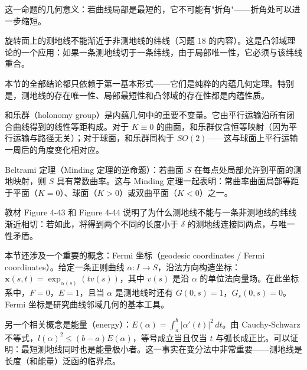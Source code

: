 这一命题的几何意义：若曲线局部是最短的，它不可能有"折角"——折角处可以进一步缩短。

\begin{Remark}
旋转面上的测地线不能渐近于非测地线的纬线（习题 18 的内容）。这是凸邻域理论的一个应用：如果一条测地线切于一条纬线，由于局部唯一性，它必须与该纬线重合。
\end{Remark}

\begin{Remark}
本节的全部结论都只依赖于第一基本形式——它们是纯粹的内蕴几何定理。特别是，测地线的存在唯一性、局部最短性和凸邻域的存在性都是内蕴性质。
\end{Remark}

\begin{Remark}
和乐群（holonomy group）是内蕴几何中的重要不变量。它由平行运输沿所有闭合曲线得到的线性等距构成。对于 $K\equiv 0$ 的曲面，和乐群仅含恒等映射（因为平行运输与路径无关）；对于球面，和乐群同构于 $SO(2)$——这与球面上平行运输一周后的角度变化相对应。
\end{Remark}

\begin{Remark}
 Beltrami 定理（Minding 定理的逆命题）：若曲面 $S$ 在每点处局部允许到平面的测地映射，则 $S$ 具有常数曲率。这与 Minding 定理一起表明：常曲率曲面局部等距于平面（$K=0$）、球面（$K>0$）或双曲平面（$K<0$）之一。
\end{Remark}

\begin{Remark}
教材 Figure 4-43 和 Figure 4-44 说明了为什么测地线不能与一条非测地线的纬线渐近相切：若如此，将得到两个不同的长度小于 $\delta$ 的测地线连接同两点，与唯一性矛盾。
\end{Remark}

\begin{Remark}
本节还涉及一个重要的概念：Fermi 坐标（geodesic coordinates / Fermi coordinates）。给定一条正则曲线 $\alpha: I \to S$，沿法方向构造坐标：$\mathbf{x}(s,t) = \exp_{\alpha(s)}(t v(s))$，其中 $v(s)$ 是沿 $\alpha$ 的单位法向量场。在此坐标系中，$F=0$，$E=1$，且当 $\alpha$ 是测地线时还有 $G(0,s)=1$，$G_s(0,s)=0$。Fermi 坐标是研究曲线邻域几何的基本工具。
\end{Remark}

\begin{Remark}
另一个相关概念是能量（energy）：$E(\alpha) = \int_a^b |\alpha'(t)|^2\, dt$。由 Cauchy-Schwarz 不等式，$l(\alpha)^2 \leq (b-a)E(\alpha)$，等号成立当且仅当 $t$ 与弧长成正比。可以证明：最短测地线同时也是能量极小者。这一事实在变分法中非常重要——测地线是长度（和能量）泛函的临界点。
\end{Remark}

